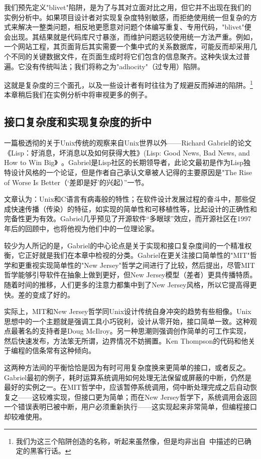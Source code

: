 \documentclass[12pt,oneside]{ctexbook}
\begin{document}
\begin{common-format}
我们预先定义"blivet"陷阱，是为了与其对立面对比之用，但它并不出现在我们的实例分析中。如果项目设计者对实现复杂度特别敏感，而拒绝使用统一但复杂的方式来解决一整类问题，相反地更愿意对问题个体编写重复、专用代码，"blivet"便会出现。其结果就是代码库尺寸暴涨，而维护问题远较使用统一方法严重。例如，一个网站工程，其页面背后其实需要一个集中式的关系数据库，可能反而却采用几个不同的关键数据文件，在页面生成时将它们包含的信息聚齐。这种失误太过普遍。它没有传统叫法；我们将称之为"adhocity"（过专用）陷阱。

这就是复杂度的三个面孔，以及一些设计者有时往往为了规避反而掉进的陷阱。\footnote{我们为这三个陷阱创造的名称，听起来虽然像，但是均非出自~\cite{Raymond96}中描述的已确定的黑客行话。}本章稍后我们在实例分析中将审视更多的例子。

\subsection{接口复杂度和实现复杂度的折中}
一篇极透彻的关于Unix传统的观察来自Unix世界以外——Richard Gabriel的论文《Lisp：好消息，坏消息以及如何获得大胜》(Lisp: Good News, Bad News, and How to Win Big》~\cite{Gabriel}。Gabriel是Lisp社区的长期领导者，此论文最初是作为Lisp独特设计风格的一个论证，但是作者自己承认文章被人记得的主要原因是"The Rise of Worse Is Better（‘差即是好’的兴起）”一节。

文章认为：Unix和C语言有病毒般的特性；在软件设计发展过程的奋斗中，那些促成快速传播（传染）的特征，如实现的简单性和可移植性等，比起设计的正确性和完备性更为有效。Gabriel几乎预见了开源软件“多眼球”效应，而开源社区在1997年后的回顾中，也将他视为他们中的一位理论家。

较少为人所记的是，Gabriel的中心论点是关于实现和接口复杂度间的一个精准权衡，它正好就是我们在本章中检视的分类。Gabriel在更关注接口简单性的"MIT"哲学和更重视实现简单性的"New Jersey"哲学之间进行了比较，然后提出，尽管MIT哲学能够引导软件在抽象上做到更好，但New Jersey模型（差者）更具传播特质。随着时间的推移，人们更多的注意力都集中到了New Jersey风格，所以它提高得更快。差的变成了好的。

实际上，MIT和New Jersey哲学同Unix设计传统自身冲突的趋势有些相像。Unix思想中的一个主题就是强调工具小巧锐利，设计从零开始，接口简单一致。这种观点最著名的支持者是Doug McIlroy。另一种思潮则强调创作简单的可工作实现，然后快速发布，方法笨无所谓，边界情况不妨搁置。Ken Thompson的代码和他关于编程的信条常有这种倾向。

这两种方法间的平衡恰恰是因为有时可用复杂度换来更简单的接口，或者反之。Gabriel最初的例子，耗时运算系统调用如何处理无法保留或屏蔽的中断，仍然是最好的实例之一。在MIT哲学中，应该暂停系统调用，伺中断处理完成之后自动恢复之——这较难实现，但接口更为简单；而在New Jersey哲学下，系统调用会返回一个错误表明已被中断，用户必须重新执行——这实现起来非常简单，但编程接口却较难使用。


\end{common-format}
\end{document}

